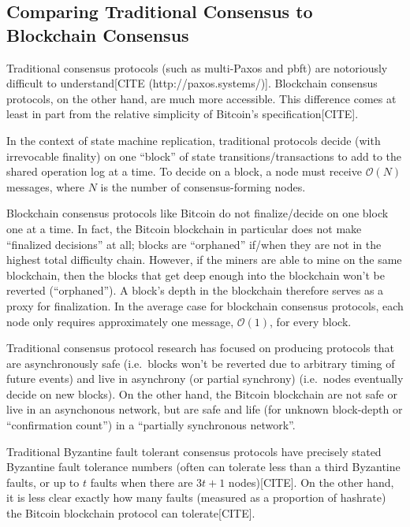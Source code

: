 \documentclass{article}
\theoremstyle{definition}
\begin{document}
\subsection{Comparing Traditional Consensus to Blockchain Consensus}

Traditional consensus protocols (such as multi-Paxos and pbft) are notoriously difficult to understand[CITE (http://paxos.systems/)]. Blockchain consensus protocols, on the other hand, are much more accessible. This difference comes at least in part from the relative simplicity of Bitcoin's specification[CITE].

In the context of state machine replication, traditional protocols decide (with irrevocable finality) on one ``block'' of state transitions/transactions to add to the shared operation log at a time. To decide on a block, a node must receive $\mathcal{O}(N)$ messages, where $N$ is the number of consensus-forming nodes.

Blockchain consensus protocols like Bitcoin do not finalize/decide on one block one at a time. In fact, the Bitcoin blockchain in particular does not make ``finalized decisions'' at all; blocks are ``orphaned'' if/when they are not in the highest total difficulty chain. However, if the miners are able to mine on the same blockchain, then the blocks that get deep enough into the blockchain won't be reverted (``orphaned''). A block's depth in the blockchain therefore serves as a proxy for finalization. In the average case for blockchain consensus protocols, each node only requires approximately one message, $\mathcal{O}(1)$, for every block.

Traditional consensus protocol research has focused on producing protocols that are asynchronously safe (i.e.\ blocks won't be reverted due to arbitrary timing of future events) and live in asynchrony (or partial synchrony) (i.e.\ nodes eventually decide on new blocks). On the other hand, the Bitcoin blockchain are not safe or live in an asynchonous network, but are safe and life (for unknown block-depth or ``confirmation count'') in a ``partially synchronous network''.

Traditional Byzantine fault tolerant consensus protocols have precisely stated Byzantine fault tolerance numbers (often can tolerate less than a third Byzantine faults, or up to $t$ faults when there are $3t + 1$ nodes)[CITE]. On the other hand, it is less clear exactly how many faults (measured as a proportion of hashrate) the Bitcoin blockchain protocol can tolerate[CITE].
\end{document}
